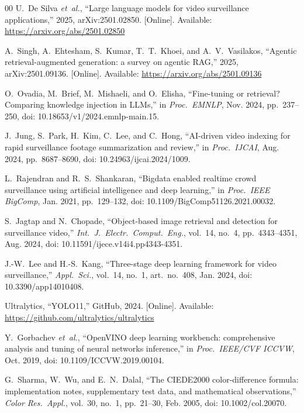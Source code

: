 ﻿\documentclass[conference]{IEEEtran}
\theoremstyle{definition}
\begin{document}
\begin{thebibliography}{00}
\fontsize{7}{8.4}\selectfont
\setlength{\itemsep}{-1pt}
\setlength{\parsep}{0pt}
 U.~De Silva \emph{et~al.}, ``Large language models for video surveillance applications,'' 2025, arXiv:2501.02850. [Online]. Available: \url{https://arxiv.org/abs/2501.02850}

 A.~Singh, A.~Ehtesham, S.~Kumar, T.~T.~Khoei, and A.~V.~Vasilakos, ``Agentic retrieval-augmented generation: a survey on agentic RAG,'' 2025, arXiv:2501.09136. [Online]. Available: \url{https://arxiv.org/abs/2501.09136}

 O.~Ovadia, M.~Brief, M.~Mishaeli, and O.~Elisha, ``Fine-tuning or retrieval? Comparing knowledge injection in LLMs,'' in \emph{Proc.\ EMNLP}, Nov. 2024, pp.~237--250, doi: 10.18653/v1/2024.emnlp-main.15.

 J.~Jung, S.~Park, H.~Kim, C.~Lee, and C.~Hong, ``AI-driven video indexing for rapid surveillance footage summarization and review,'' in \emph{Proc.\ IJCAI}, Aug. 2024, pp.~8687--8690, doi: 10.24963/ijcai.2024/1009.

 L.~Rajendran and R.~S.~Shankaran, ``Bigdata enabled realtime crowd surveillance using artificial intelligence and deep learning,'' in \emph{Proc.\ IEEE BigComp}, Jan. 2021, pp.~129--132, doi: 10.1109/BigComp51126.2021.00032.

 S.~Jagtap and N.~Chopade, ``Object-based image retrieval and detection for surveillance video,'' \emph{Int.\ J.\ Electr.\ Comput.\ Eng.}, vol.~14, no.~4, pp.~4343--4351, Aug. 2024, doi: 10.11591/ijece.v14i4.pp4343-4351.

 J.-W.~Lee and H.-S.~Kang, ``Three-stage deep learning framework for video surveillance,'' \emph{Appl.\ Sci.}, vol.~14, no.~1, art.\ no.~408, Jan. 2024, doi: 10.3390/app14010408.

 Ultralytics, ``YOLO11,'' GitHub, 2024. [Online]. Available: \url{https://github.com/ultralytics/ultralytics}

 Y.~Gorbachev \emph{et~al.}, ``OpenVINO deep learning workbench: comprehensive analysis and tuning of neural networks inference,'' in \emph{Proc.\ IEEE/CVF ICCVW}, Oct. 2019, doi: 10.1109/ICCVW.2019.00104.

 G.~Sharma, W.~Wu, and E.~N.~Dalal, ``The CIEDE2000 color-difference formula: implementation notes, supplementary test data, and mathematical observations,'' \emph{Color Res.\ Appl.}, vol.~30, no.~1, pp.~21--30, Feb. 2005, doi: 10.1002/col.20070.


\end{thebibliography}
\end{document}
